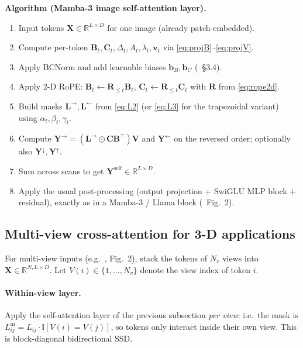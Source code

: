 \documentclass[11pt,a4paper]{article}
\begin{document}
\medskip
\noindent\textbf{Algorithm (Mamba-3 image self-attention layer).}
\begin{enumerate}
  \item Input tokens $\bm{X}\in\mathbb{R}^{L\times D}$ for one image
        (already patch-embedded).
  \item Compute per-token $\bm{B}_t,\bm{C}_t,\Delta_t,A_t,\lambda_t,\bm{v}_t$
        via \eqref{eq:projB}–\eqref{eq:projV}.
  \item Apply BCNorm and add learnable biases $\bm{b}_B,\bm{b}_C$
        (\cite{mamba3}~\S 3.4).
  \item Apply 2-D RoPE: $\bm{B}_t\leftarrow \bm{R}_{\le t}\bm{B}_t$,
        $\bm{C}_t\leftarrow \bm{R}_{\le t}\bm{C}_t$
        with $\bm{R}$ from \eqref{eq:rope2d}.
  \item Build masks $\bm{L}^{\to},\bm{L}^{\leftarrow}$ from
        \eqref{eq:L2} (or \eqref{eq:L3} for the trapezoidal
        variant) using $\alpha_t,\beta_t,\gamma_t$.
  \item Compute $\bm{Y}^\to = (\bm{L}^\to\odot\bm{C}\bm{B}^\top)\bm{V}$
        and $\bm{Y}^\leftarrow$ on the reversed order; optionally
        also $\bm{Y}^\downarrow,\bm{Y}^\uparrow$.
  \item Sum across scans to get
        $\bm{Y}^{\text{self}}\in\mathbb{R}^{L\times D}$.
  \item Apply the usual post-processing (output projection +
        SwiGLU MLP block + residual), exactly as in a Mamba-3 /
        Llama block (\cite{mamba3}~Fig.~2).
\end{enumerate}

\subsection{Multi-view cross-attention for 3-D applications}
\label{sec:multiview}

For multi-view inputs (e.g.\ \cite{depthanything3}, Fig.~2),
stack the tokens of $N_v$ views into
$\bm{X}\in\mathbb{R}^{N_v L \times D}$. Let $V(i)\in\{1,\dots,N_v\}$
denote the view index of token $i$.

\paragraph{Within-view layer.} Apply the self-attention layer of the
previous subsection \emph{per view}: i.e.\ the mask is
$L_{ij}^{\text{in}} = L_{ij}\cdot\mathbb{I}[V(i)=V(j)]$, so tokens
only interact inside their own view. This is block-diagonal
bidirectional SSD.
\end{document}
